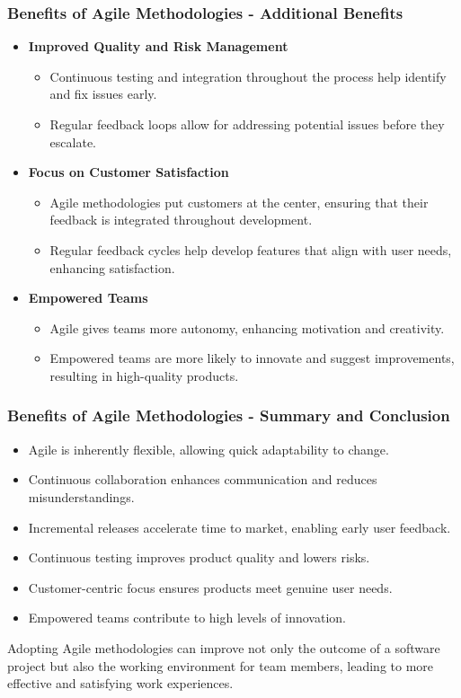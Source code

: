 \documentclass{beamer}
\begin{document}
\begin{frame}[fragile]
    \frametitle{Benefits of Agile Methodologies - Additional Benefits}
    \begin{itemize}
        \item \textbf{Improved Quality and Risk Management}
            \begin{itemize}
                \item Continuous testing and integration throughout the process help identify and fix issues early.
                \item Regular feedback loops allow for addressing potential issues before they escalate.
            \end{itemize}

        \item \textbf{Focus on Customer Satisfaction}
            \begin{itemize}
                \item Agile methodologies put customers at the center, ensuring that their feedback is integrated throughout development.
                \item Regular feedback cycles help develop features that align with user needs, enhancing satisfaction.
            \end{itemize}

        \item \textbf{Empowered Teams}
            \begin{itemize}
                \item Agile gives teams more autonomy, enhancing motivation and creativity.
                \item Empowered teams are more likely to innovate and suggest improvements, resulting in high-quality products.
            \end{itemize}
    \end{itemize}
\end{frame}

\begin{frame}[fragile]
    \frametitle{Benefits of Agile Methodologies - Summary and Conclusion}
    \begin{itemize}
        \item Agile is inherently flexible, allowing quick adaptability to change.
        \item Continuous collaboration enhances communication and reduces misunderstandings.
        \item Incremental releases accelerate time to market, enabling early user feedback.
        \item Continuous testing improves product quality and lowers risks.
        \item Customer-centric focus ensures products meet genuine user needs.
        \item Empowered teams contribute to high levels of innovation.
    \end{itemize}

    Adopting Agile methodologies can improve not only the outcome of a software project but also the working environment for team members, leading to more effective and satisfying work experiences.
\end{frame}
\end{document}
